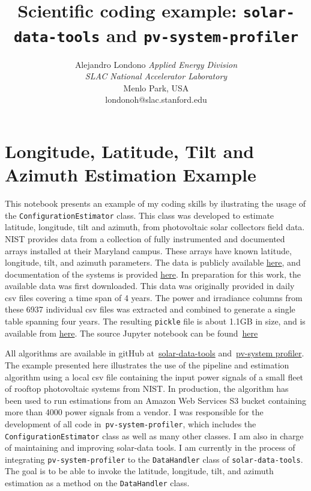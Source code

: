\documentclass[11pt]{article}
\title{Scientific coding example: \texttt{solar-data-tools} and \texttt{pv-system-profiler}}
\author{
	Alejandro Londono \textit{Applied Energy Division} \\ \textit{SLAC National Accelerator Laboratory}\\	Menlo Park, USA \\ londonoh@slac.stanford.edu
}
\begin{document}
    
    \maketitle
    
    

    
    \hypertarget{longitude-latitude-tilt-and-azimuth-estimation-example}{%
	\section{Longitude, Latitude, Tilt and Azimuth Estimation
		Example}\label{longitude-latitude-tilt-and-azimuth-estimation-example}}
This notebook presents an example of my coding skills by ilustrating the usage of the
\texttt{ConfigurationEstimator} class. This class was developed to estimate latitude, longitude, tilt and azimuth, from photovoltaic solar collectors  field
data. NIST provides data from a collection of fully instrumented and
documented arrays installed at their Maryland campus. These arrays have
known latitude, longitude, tilt, and azimuth parameters. The data is
publicly available \href{https://doi.org/10.18434/M3S67G}{here}, and
documentation of the systems is provided
\href{http://dx.doi.org/10.6028/NIST.TN.1896}{here}. In preparation for
this work, the available data was first downloaded. This data was originally
provided in daily csv files covering a time span of 4 years. The
power and irradiance columns from these 6937 individual csv files was
extracted and combined to generate a single table spanning four
years. The resulting \texttt{pickle} file is about 1.1GB in size, and is
available from
\href{https://1drv.ms/u/s!AgjnPqOMN1vAgSRwEUqQ67UsTkLf?e=j6SIdA}{here}.
 The source Jupyter notebook can be found~\href{https://1drv.ms/u/s!AgjnPqOMN1vAgSUmlRfK3yD6Yvn8?e=azVRXV}{here}


All algorithms are available in gitHub at~\href{https://github.com/slacgismo/solar-data-tools}{solar-data-tools} and~\href{https://github.com/slacgismo/pv-system-profiler/tree/run\_scripts}{pv-system profiler}. The example presented here illustrates the use of the pipeline and estimation algorithm using a local csv file containing the input power signals of a small fleet of rooftop photovoltaic systems from NIST. In production, the algorithm has been used to run estimations from an Amazon Web Services S3 bucket containing more than 4000 power signals from a vendor.
 I was responsible for the development of all code in~\texttt{pv-system-profiler}, which includes the \texttt{ConfigurationEstimator} class as well as many other classes. I am also in charge of maintaining and improving solar-data tools. I am currently in the process of integrating \texttt{pv-system-profiler} to the \texttt{DataHandler} class of \texttt{solar-data-tools}. The goal is to be able to invoke the latitude, longitude, tilt, and azimuth estimation as a method on the \texttt{DataHandler} class. 
\end{document}
